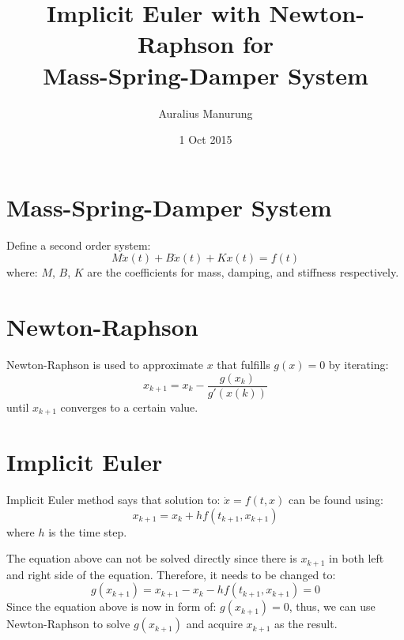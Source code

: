 \documentclass[english, 11pt]{article}
\title{\textbf{Implicit Euler with Newton-Raphson for\\
               Mass-Spring-Damper System}}
\author{Auralius Manurung}
\date{1 Oct 2015}
\begin{document}
\maketitle

\section{Mass-Spring-Damper System}
Define a second order system:
\begin{equation}
  M\ddot{x}(t)+B\dot{x}(t)+Kx(t) = f(t)
\end{equation}
where: $M$, $B$, $K$ are the coefficients for mass, damping, and stiffness respectively.

\section{Newton-Raphson}
Newton-Raphson is used to approximate $x$ that fulfills $g(x) = 0$ by iterating:
\begin{equation}
  x_{k+1} = x_k - \frac{g(x_k)}{g'(x(k))}
\end{equation}
until $x_{k+1}$ converges to a certain value.

\section{Implicit Euler}
Implicit Euler method says that solution to: $\dot{x} = f(t, x)$ can be found using:
\begin{equation}
  \label{eqn:euler_basic_eqn}
  x_{k+1} = x_k + hf(t_{k+1}, x_{k+1})
\end{equation}
where $h$ is the time step.

The equation above can not be solved directly since there is $x_{k+1}$ in both left and right side of the equation. Therefore, it needs to be changed to:
\begin{equation}
  g(x_{k+1}) = x_{k+1} - x_k - hf(t_{k+1}, x_{k+1}) = 0
\end{equation}
Since the equation above is now in form of: $g(x_{k+1})=0$, thus, we can use Newton-Raphson to solve $g(x_{k+1})$ and acquire $x_{k+1}$ as the result.

\end{document}
